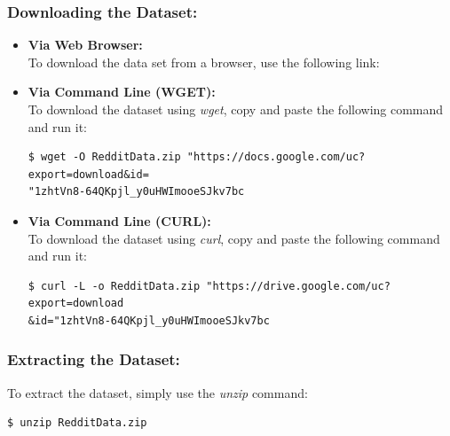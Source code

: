 \documentclass{article}
\begin{document}
\subsubsection*{Downloading the Dataset:}
\begin{itemize}
    \item \textbf{Via Web Browser:}\\
        To download the data set from a browser, use the following link:
        \begin{center}
        \href{https://drive.google.com/uc?export=download&id=1zhtVn8-64QKpjl_y0uHWImooeSJkv7bc}{\color{blue}{https://drive.google.com/uc?export=download\&id=1zhtVn8-64QKpjl\_y0uHWImooeSJkv7bc}}
        \end{center}
    \item \textbf{Via Command Line (WGET):}\\
        To download the dataset using \textit{wget}, copy and paste the following command and run it:
        \begin{commandline}\begin{verbatim}$ wget -O RedditData.zip "https://docs.google.com/uc?export=download&id=
"1zhtVn8-64QKpjl_y0uHWImooeSJkv7bc\end{verbatim}\end{commandline}
    \item \textbf{Via Command Line (CURL):}\\
        To download the dataset using \textit{curl}, copy and paste the following command and run it:
        \begin{commandline}\begin{verbatim}$ curl -L -o RedditData.zip "https://drive.google.com/uc?export=download
&id="1zhtVn8-64QKpjl_y0uHWImooeSJkv7bc\end{verbatim}\end{commandline}
\end{itemize}

\subsubsection*{Extracting the Dataset:}
To extract the dataset, simply use the \textit{unzip} command:
\begin{commandline}\begin{verbatim}$ unzip RedditData.zip\end{verbatim}\end{commandline}
\end{document}
